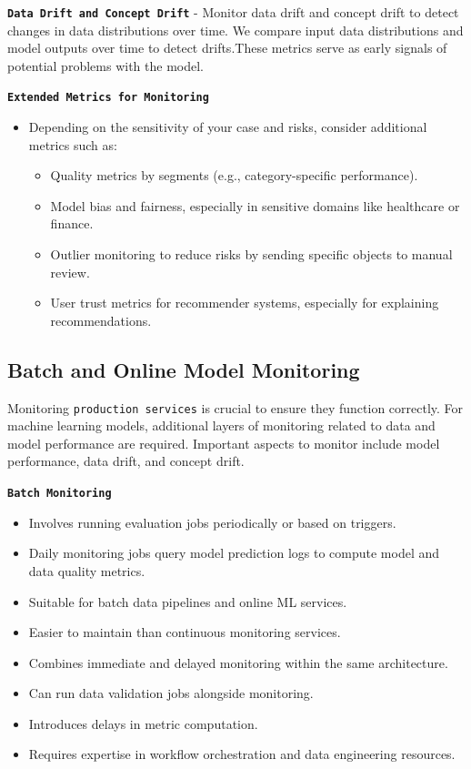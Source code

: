 \documentclass[letterpaper,12pt,notitlepage,twoside]{report}
\begin{document}
\texttt{\textbf{Data Drift and Concept Drift}} -  Monitor data drift and concept drift to detect changes in data distributions over time. We compare input data distributions and model outputs over time to detect drifts.These metrics serve as early signals of potential problems with the model.

\texttt{\textbf{Extended Metrics for Monitoring}}
\begin{itemize}[noitemsep, topsep=0pt]
    \item Depending on the sensitivity of your case and risks, consider additional metrics such as:
    \begin{itemize}
        \item Quality metrics by segments (e.g., category-specific performance).
        \item Model bias and fairness, especially in sensitive domains like healthcare or finance.
        \item Outlier monitoring to reduce risks by sending specific objects to manual review.
        \item User trust metrics for recommender systems, especially for explaining recommendations.
    \end{itemize}
\end{itemize}

\newpage
\subsection{Batch and Online Model Monitoring}

    \begin{mathaside}[frametitle=\mathtitle{Importance \color{firebrick}{of Monitoring}}]
       Monitoring  \texttt{production services} is crucial to ensure they function correctly. For machine learning models, additional layers of monitoring related to data and model performance are required. Important aspects to monitor include model performance, data drift, and concept drift.
    \end{mathaside}

\texttt{\textbf{Batch Monitoring}}
\begin{itemize}[noitemsep, topsep=0pt]
    \item Involves running evaluation jobs periodically or based on triggers.
    \item Daily monitoring jobs query model prediction logs to compute model and data quality metrics.
    \item Suitable for batch data pipelines and online ML services.
    \item Easier to maintain than continuous monitoring services.
    \item Combines immediate and delayed monitoring within the same architecture.
    \item Can run data validation jobs alongside monitoring.
    \item Introduces delays in metric computation.
    \item Requires expertise in workflow orchestration and data engineering resources.
\end{itemize}
\end{document}
